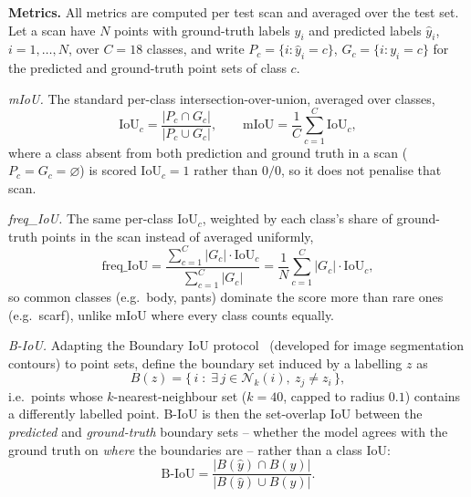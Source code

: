 \documentclass{article}
\theoremstyle{plain}
\theoremstyle{definition}
\theoremstyle{remark}
\begin{document}
\textbf{Metrics.} All metrics are computed per test scan and averaged over the
test set. Let a scan have $N$ points with ground-truth labels $y_i$ and
predicted labels $\hat y_i$, $i=1,\dots,N$, over $C{=}18$ classes, and write
$P_c = \{i : \hat y_i = c\}$, $G_c = \{i : y_i = c\}$ for the predicted and
ground-truth point sets of class $c$.

\emph{mIoU.} The standard per-class intersection-over-union, averaged over
classes,
\begin{equation}
  \text{IoU}_c = \frac{|P_c \cap G_c|}{|P_c \cup G_c|}, \qquad
  \text{mIoU} = \frac{1}{C}\sum_{c=1}^{C} \text{IoU}_c,
  \label{eq:miou}
\end{equation}
where a class absent from both prediction and ground truth in a scan
($P_c = G_c = \varnothing$) is scored $\text{IoU}_c{=}1$ rather than
$0/0$, so it does not penalise that scan.

\emph{freq\_IoU.} The same per-class $\text{IoU}_c$, weighted by each class's
share of ground-truth points in the scan instead of averaged uniformly,
\begin{equation}
  \text{freq\_IoU} = \frac{\sum_{c=1}^{C} |G_c| \cdot \text{IoU}_c}{\sum_{c=1}^{C} |G_c|} = \frac{1}{N}\sum_{c=1}^{C} |G_c| \cdot \text{IoU}_c,
  \label{eq:freqiou}
\end{equation}
so common classes (e.g.\ body, pants) dominate the score more than rare ones
(e.g.\ scarf), unlike mIoU where every class counts equally.

\emph{B-IoU.} Adapting the Boundary IoU protocol~\cite{biou} (developed for
image segmentation contours) to point sets, define the boundary set induced
by a labelling $z$ as
\begin{equation}
  B(z) = \big\{\, i \;:\; \exists\, j \in \mathcal{N}_k(i),\ z_j \neq z_i \,\big\},
  \label{eq:boundary-set}
\end{equation}
i.e.\ points whose $k$-nearest-neighbour set ($k{=}40$, capped to radius
$0.1$) contains a differently labelled point. B-IoU is then the set-overlap
IoU between the \emph{predicted} and \emph{ground-truth} boundary sets --
whether the model agrees with the ground truth on \emph{where} the
boundaries are -- rather than a class IoU:
\begin{equation}
  \text{B-IoU} = \frac{|B(\hat y) \cap B(y)|}{|B(\hat y) \cup B(y)|}.
  \label{eq:biou}
\end{equation}
\end{document}
